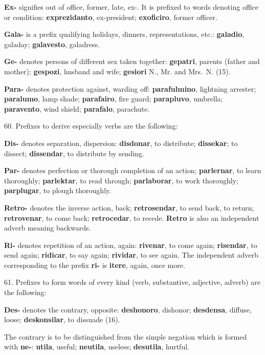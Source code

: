 \textbf{Ex-} signifies out of office, former, late, ex-. It is prefixed to words denoting office or condition: \textbf{exprezidanto}, ex-president; \textbf{exoficiro}, former officer. 

\textbf{Gala-} is a prefix qualifying holidays, dinners, representations, etc.: \textbf{galadio}, galaday; \textbf{galavesto}, galadress. 

\textbf{Ge-} denotes persons of different sex taken together: \textbf{gepatri}, parents (father and mother); \textbf{gespozi}, husband and wife; \textbf{gesiori} N., Mr. and Mrs.~N. (15). 

\textbf{Para-} denotes protection against, warding off: \textbf{parafulmino}, lightning arrester; \textbf{paralumo}, lamp shade; \textbf{parafairo}, fire guard; \textbf{parapluvo}, umbrella; \textbf{paravento}, wind shield; \textbf{parafalo}, parachute. 

60. Prefixes to derive especially verbs are the following:

\textbf{Dis-} denotes separation, dispersion: \textbf{disdonar}, to distribute; \textbf{dissekar}; to dissect; \textbf{dissendar}, to distribute by sending. 

\textbf{Par-} denotes perfection or thorough completion of an action; \textbf{parlernar}, to learn thoroughly; \textbf{parlektar}, to read through; \textbf{parlaborar}, to work thoroughly; \textbf{parplugar}, to plough thoroughly. 

\textbf{Retro-} denotes the inverse action, back; \textbf{retrosendar}, to send back, to return; \textbf{retrovenar}, to come back; \textbf{retrocedar}, to recede. \textbf{Retro} is also an independent adverb meaning backwards. 

\textbf{Ri-} denotes repetition of an action, again: \textbf{rivenar}, to come again; \textbf{risendar}, to send again; \textbf{ridicar}, to say again; \textbf{rividar}, to see again. The independent adverb corresponding to the prefix \textbf{ri-} is \textbf{itere}, again, once more. 

61. Prefixes to form words of every kind (verb, substantive, adjective, adverb) are the following: 

\textbf{Des-} denotes the contrary, opposite: \textbf{deshonoro}, dishonor; \textbf{desdensa}, diffuse, loose; \textbf{deskonsilar}, to dissuade (16). 

The contrary is to be distinguished from the simple negation which is formed with \textbf{ne-}: \textbf{utila}, useful; \textbf{neutila}, useless; \textbf{desutila}, hurtful. 

